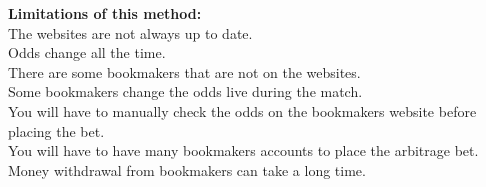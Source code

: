 \textbf{Limitations of this method:} \\
The websites are not always up to date.\\
Odds change all the time.\\
There are some bookmakers that are not on the websites.\\
Some bookmakers change the odds live during the match.\\
You will have to manually check the odds on the bookmakers website before placing the bet.\\
You will have to have many bookmakers accounts to place the arbitrage bet.\\
Money withdrawal from bookmakers can take a long time.\\





